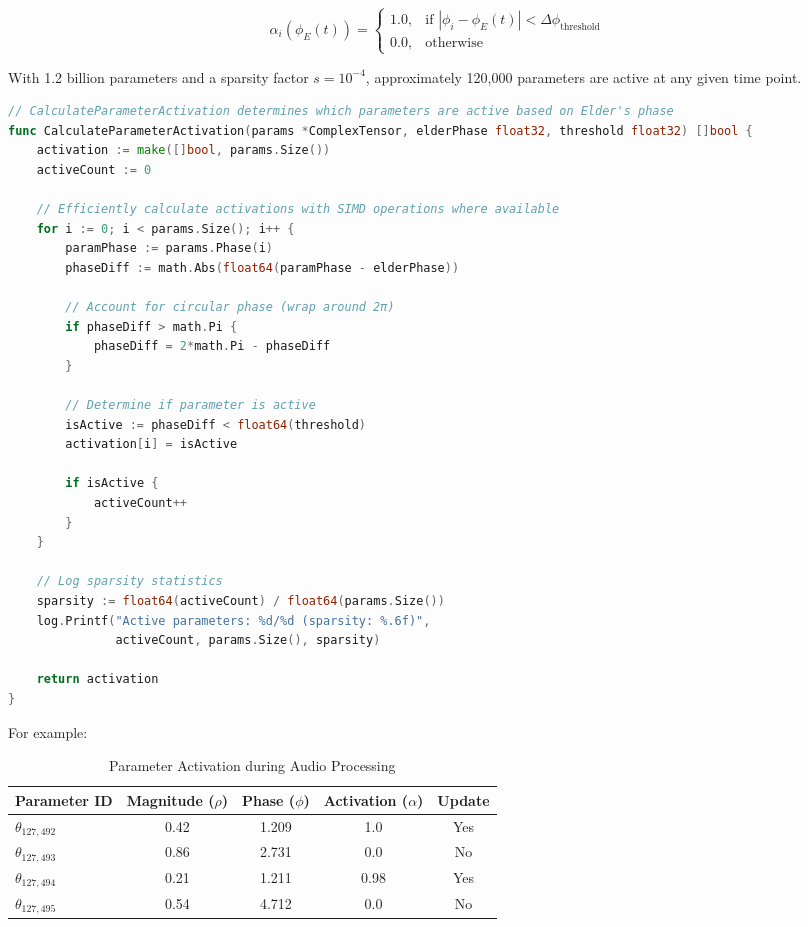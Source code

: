 \begin{equation}
\alpha_i(\phi_E(t)) = \begin{cases}
1.0, & \text{if } |\phi_i - \phi_E(t)| < \Delta\phi_{\text{threshold}} \\
0.0, & \text{otherwise}
\end{cases}
\end{equation}

With 1.2 billion parameters and a sparsity factor $s = 10^{-4}$, approximately 120,000 parameters are active at any given time point. 

\begin{lstlisting}[language=Go, caption=Parameter Activation Function in Go]
// CalculateParameterActivation determines which parameters are active based on Elder's phase
func CalculateParameterActivation(params *ComplexTensor, elderPhase float32, threshold float32) []bool {
    activation := make([]bool, params.Size())
    activeCount := 0
    
    // Efficiently calculate activations with SIMD operations where available
    for i := 0; i < params.Size(); i++ {
        paramPhase := params.Phase(i)
        phaseDiff := math.Abs(float64(paramPhase - elderPhase))
        
        // Account for circular phase (wrap around 2π)
        if phaseDiff > math.Pi {
            phaseDiff = 2*math.Pi - phaseDiff
        }
        
        // Determine if parameter is active
        isActive := phaseDiff < float64(threshold)
        activation[i] = isActive
        
        if isActive {
            activeCount++
        }
    }
    
    // Log sparsity statistics
    sparsity := float64(activeCount) / float64(params.Size())
    log.Printf("Active parameters: %d/%d (sparsity: %.6f)", 
               activeCount, params.Size(), sparsity)
    
    return activation
}
\end{lstlisting}

For example:

\begin{table}[h]
\centering
\begin{tabular}{|l|c|c|c|c|}
\hline
\textbf{Parameter ID} & \textbf{Magnitude ($\rho$)} & \textbf{Phase ($\phi$)} & \textbf{Activation ($\alpha$)} & \textbf{Update} \\
\hline
$\theta_{127,492}$ & 0.42 & 1.209 & 1.0 & Yes \\
$\theta_{127,493}$ & 0.86 & 2.731 & 0.0 & No \\
$\theta_{127,494}$ & 0.21 & 1.211 & 0.98 & Yes \\
$\theta_{127,495}$ & 0.54 & 4.712 & 0.0 & No \\
\hline
\end{tabular}
\caption{Parameter Activation during Audio Processing}
\end{table}

